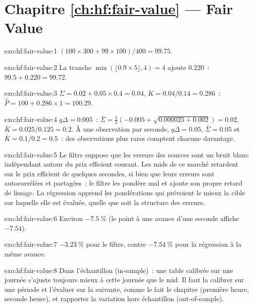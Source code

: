 \section*{Chapitre \ref{ch:hf:fair-value} --- Fair Value}

\begin{solution}{exo:hf:fair-value:1}
$(100\times300+99\times100)/400=99.75$.
\end{solution}

\begin{solution}{exo:hf:fair-value:2}
La tranche $\min(\lfloor0.9\times5\rfloor,4)=4$ ajoute 0.220~: $99.5+0.220=99.72$.
\end{solution}

\begin{solution}{exo:hf:fair-value:3}
$\Sigma=0.02+0.05\times0.4=0.04$, $K=0.04/0.14=0.286$~; $\hat P=100+0.286\times1=100.29$.
\end{solution}

\begin{solution}{exo:hf:fair-value:4}
$q\Delta=0.005$~: $\bar\Sigma=\tfrac12(-0.005+\sqrt{0.000025+0.002})=0.02$, $\bar K=0.025/0.125=0.2$. À une observation par seconde,
$q\Delta=0.05$, $\bar\Sigma=0.05$ et $\bar K=0.1/0.2=0.5$~: des observations plus rares comptent chacune davantage.
\end{solution}

\begin{solution}{exo:hf:fair-value:5}
Le filtre suppose que les erreurs des sources sont un bruit blanc indépendant autour du prix efficient courant. Les mids de ce marché retardent sur le prix efficient
de quelques secondes, si bien que leurs erreurs sont autocorrélées et partagées~; le filtre les pondère mal et ajoute son propre retard de lissage. La régression
apprend les pondérations qui prévoient le mieux la cible sur laquelle elle est évaluée, quelle que soit la structure des erreurs.
\end{solution}

\begin{solution}{exo:hf:fair-value:6}
Environ $-7.5~\%$ (le point à une avance d'une seconde affiche $-7.54$).
\end{solution}

\begin{solution}{exo:hf:fair-value:7}
$-3.23~\%$ pour le filtre, contre $-7.54~\%$ pour la régression à la même avance.
\end{solution}

\begin{solution}{exo:hf:fair-value:8}
Dans l'échantillon (in-sample)~: une table calibrée sur une journée s'ajuste toujours mieux à cette journée que le mid. Il faut la calibrer sur une période et l'évaluer sur la suivante, comme le fait le chapitre
(première heure, seconde heure), et rapporter la variation hors échantillon (out-of-sample).
\end{solution}

